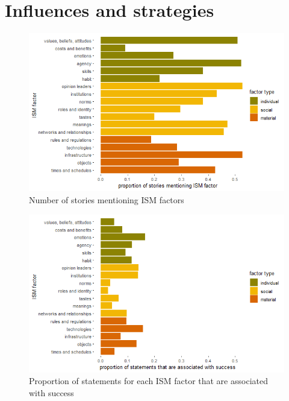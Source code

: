 \section{Influences and strategies}\label{sec:resultsISM}



\begin{figure}[!ht]
    \centering
    \includegraphics[width=1\linewidth]{figures/stories_mentioning_ism_factor.png}
    \caption{Number of stories mentioning ISM factors}
    \label{fig:ismstorycount}
\end{figure}

\begin{figure}[!ht]
    \centering
    \includegraphics[width=1\linewidth]{figures/statements_associated_with_success.png}
    \caption{Proportion of statements for each ISM factor that are associated with success}
    \label{fig:ismsuccess}
\end{figure}

